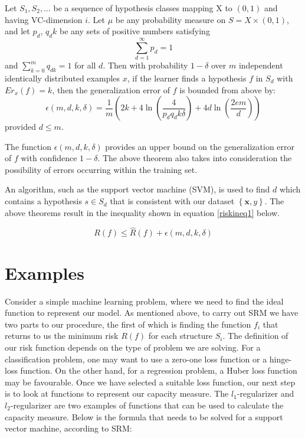 \begin{srmtheorem} \label{Th:srmthm2}
Let $S_{1},S_{2},\ldots$ be a sequence of hypothesis classes mapping {X} to $\left(0,1\right)$ and having VC-dimension $i$. Let $\mu$ be any probability measure on $S=X\times\left(0,1\right)$, and let $p_d$, $q_dk$ be any sets of positive numbers satisfying 
\begin{equation}\label{srmeqn2}
\displaystyle \sum_{d=1}^{\infty} p_{d} = 1
\end{equation}
and $\sum_{k=0}^{m} q_{dk} = 1$ for all $d$. Then with probability $1-\delta$ over $m$ independent identically distributed examples $x$, if the learner finds a hypothesis $f$ in $S_d$ with $Er_{x}(f)=k$, then the generalization error of $f$ is bounded from above by:
\begin{equation}\label{srmthm}
\epsilon(m,d,k,\delta)=\frac{1}{m}\left(2k+4\ln\left(\frac{4}{{p_d}{q_dk}{\delta}}\right)+4d\ln\left(\frac{2em}{d}\right)\right)
\end{equation}
provided $d \leq m$.
\end{srmtheorem}

The function $\epsilon(m,d,k,\delta)$ provides an upper bound on the generalization error of $f$ with confidence $1-\delta$. The above theorem also takes into consideration the possibility of errors occurring within the training set. 

An algorithm, such as the support vector machine (SVM), is used to find $d$ which contains a hypothesis $s \in S_d$ that is consistent with our dataset $\left\{\mathbf{x},y\right\}$. The above theorems result in the inequality shown in equation \ref{riskineq1} below.

\begin{equation}\label{riskineq1}
    R(f)\leq \hat{R}(f)+\epsilon(m,d,k,\delta)
\end{equation}


\section{Examples}\label{sec:examples}


Consider a simple machine learning problem, where we need to find the ideal function to represent our model. As mentioned above, to carry out SRM we have two parts to our procedure, the first of which is finding the function $f_{i}$ that returns to us the minimum risk $R(f)$ for each structure $S_{i}$. The definition of our risk function depends on the type of problem we are solving. For a classification problem, one may want to use a zero-one loss function or a hinge-loss function. On the other hand, for a regression problem, a Huber loss function may be favourable. Once we have selected a suitable loss function, our next step is to look at functions to represent our capacity measure. The $l_{1}$-regularizer and $l_{2}$-regularizer are two examples of functions that can be used to calculate the capacity measure. 
\newline
Below is the formula that needs to be solved for a support vector machine, according to SRM:

